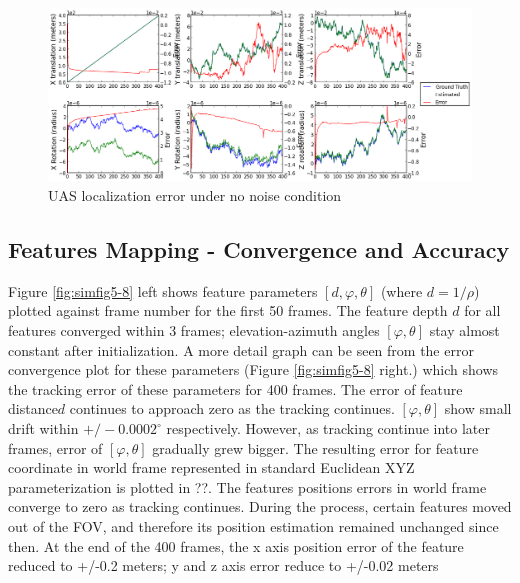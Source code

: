 \begin{figure}[h]
\centering
\includegraphics[scale=0.3]{./Figures/SimulationFigures/Figure1.png}
\caption{UAS localization error under no noise condition}
\label{fig:simfig1}
\end{figure}


\subsection{Features Mapping - Convergence and Accuracy}

Figure \ref{fig:simfig5-8} left shows feature parameters $[d, \varphi
,\theta]$ (where $d=1/\rho $) plotted against frame number for the
first 50 frames. The feature depth $d$ for all features converged
within 3 frames; elevation-azimuth angles $[\varphi ,\theta]$ stay
almost constant after initialization. A more detail graph can be seen
from the error convergence plot for these parameters (Figure
\ref{fig:simfig5-8} right.) which shows the tracking error of these
parameters for 400 frames. The error of feature distance$ d$ continues
to approach zero as the tracking continues. $[\varphi ,\theta]$ show
small drift within $+/-0.0002^{\circ}$ respectively. However, as
tracking continue into later frames, error of $[\varphi ,\theta]$
gradually grew bigger. The resulting error for feature coordinate in
world frame represented in standard Euclidean XYZ parameterization is
plotted in ??. The features positions errors in world frame converge
to zero as tracking continues. During the process, certain features
moved out of the FOV, and therefore its position estimation remained
unchanged since then. At the end of the 400 frames, the x axis
position error of the feature reduced to +/-0.2 meters; y and z axis
error reduce to +/-0.02 meters

